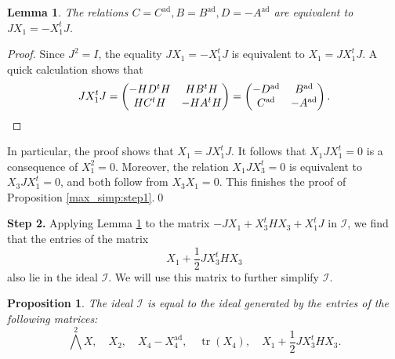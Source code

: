 \documentclass[pdflatex,sn-mathphys-num]{sn-jnl}%
\theoremstyle{thmstyleone}%
\newtheorem{proposition}[subsubsection]{Proposition}%
\newtheorem{lemma}[subsubsection]{Lemma}%
\theoremstyle{thmstyletwo}%
\numberwithin{equation}{subsection}
\theoremstyle{thmstylethree}%
\newcommand{\CI}{\ensuremath{\mathcal{I}}\xspace}
\newcommand{\ad}{\mathrm{ad}}
\DeclareMathOperator{\tr}{tr}
\begin{document}
		
		
\begin{lemma}\label{max_simp:step1_ad}
	The relations $C=C^{\ad}, B=B^{\ad},D=-A^{\ad}$ are equivalent to $JX_1=-X_1^tJ$.
\end{lemma}
\begin{proof}
	Since $J^2=I$, the equality $JX_1=-X_1^tJ$ is equivalent to $X_1=JX_1^tJ$. A quick calculation shows that
\begin{equation*}
	JX_1^tJ=\left(\begin{matrix}-HD^tH&HB^tH\\HC^tH&-HA^tH\end{matrix}\right)=
	\left(\begin{matrix}
		-D^\ad  &   B^\ad\\
		C^\ad   &   -A^\ad
	\end{matrix}\right).\qedhere
\end{equation*}
\end{proof}
In particular, the proof shows that $X_1=JX_1^tJ$. 
It follows that $X_1JX_1^t=0$ is a consequence of $X_1^2=0$.
Moreover, the relation $X_1JX_3^t=0$ is equivalent to $X_3JX_1^t=0$, and both follow from $X_3X_1=0$. This finishes the proof of Proposition \ref{max_simp:step1}.\qed

\bigskip
\noindent\textbf{Step 2.}
Applying Lemma \ref{max_simp:step1_ad} to the matrix $-JX_1+X_3^t HX_3+X_1^t J$ in $\CI$, we find that the entries of the matrix
\[
X_1+\frac{1}{2}JX_3^tHX_3
\]
also lie in the ideal $\CI$.
We will use this matrix to further simplify $\CI$.
\begin{proposition}\label{max_simp:simp-step2}
	The ideal $\CI$ is equal to the ideal generated by the entries of the following matrices:
\begin{equation}\label{max_simp:simp-step2-ideal-generator}
	\bigwedge^2 X,\quad X_2,\quad X_4-X_4^{\ad},\quad \tr(X_4),\quad  X_1+\frac{1}{2}JX_3^tHX_3.
\end{equation}
\end{proposition}
		
\end{document}
